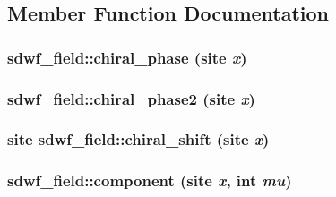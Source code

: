 \subsection{Member Function Documentation}
\hypertarget{classsdwf__field_a29fce204e377b7a190455e4faf0a2a0c}{
\subsubsection[{chiral\_\-phase}]{ sdwf\_\-field::chiral\_\-phase (site {\em x})}}
\label{classsdwf__field_a29fce204e377b7a190455e4faf0a2a0c}
\hypertarget{classsdwf__field_a67fe2a75323e3dcfce3675cce0bbb312}{
\subsubsection[{chiral\_\-phase2}]{ sdwf\_\-field::chiral\_\-phase2 (site {\em x})}}
\label{classsdwf__field_a67fe2a75323e3dcfce3675cce0bbb312}
\hypertarget{classsdwf__field_a5cff8766c1891c6240c97d17c6bb63b9}{
\subsubsection[{chiral\_\-shift}]{\setlength{\rightskip}{0pt plus 5cm}site sdwf\_\-field::chiral\_\-shift (site {\em x})}}
\label{classsdwf__field_a5cff8766c1891c6240c97d17c6bb63b9}
\hypertarget{classsdwf__field_aa834c736322bef716cd0e31a391623d3}{
\subsubsection[{component}]{ sdwf\_\-field::component (site {\em x}, \/  int {\em mu})}}
